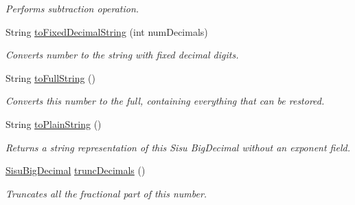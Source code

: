 \begin{DoxyCompactItemize}
\begin{DoxyCompactList}\small\item\em Performs subtraction operation. \end{DoxyCompactList}\item 
String \hyperlink{classcom_1_1aarrelaakso_1_1drawl_1_1_sisu_big_decimal_aa50e4eab549ecda56977c2480674055b}{to\+Fixed\+Decimal\+String} (int num\+Decimals)
\begin{DoxyCompactList}\small\item\em Converts number to the string with fixed decimal digits. \end{DoxyCompactList}\item 
String \hyperlink{classcom_1_1aarrelaakso_1_1drawl_1_1_sisu_big_decimal_aa1fdb9a9086d8a7a0c75f7b2acbf4931}{to\+Full\+String} ()
\begin{DoxyCompactList}\small\item\em Converts this number to the full, containing everything that can be restored. \end{DoxyCompactList}\item 
String \hyperlink{classcom_1_1aarrelaakso_1_1drawl_1_1_sisu_big_decimal_aad76de7e2c8ced754cc3f98f53f5e692}{to\+Plain\+String} ()
\begin{DoxyCompactList}\small\item\em Returns a string representation of this Sisu Big\+Decimal without an exponent field. \end{DoxyCompactList}\item 
\hyperlink{classcom_1_1aarrelaakso_1_1drawl_1_1_sisu_big_decimal}{Sisu\+Big\+Decimal} \hyperlink{classcom_1_1aarrelaakso_1_1drawl_1_1_sisu_big_decimal_ab81d0189bbfd5f1b69de6781ac383ac3}{trunc\+Decimals} ()
\begin{DoxyCompactList}\small\item\em Truncates all the fractional part of this number. \end{DoxyCompactList}\end{DoxyCompactItemize}
